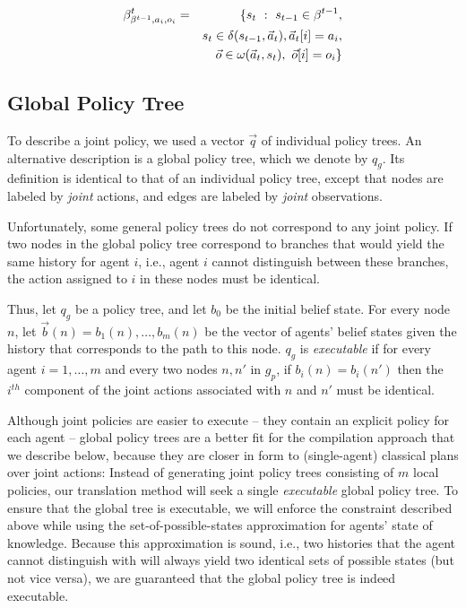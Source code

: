 \documentclass[letterpaper]{article}
\theoremstyle{definition}
\begin{document}
\begin{eqnarray}
\scriptsize
\beta^t_{\beta^{t-1},a_i,o_i} &=& \{ s_{t}~: ~s_{t-1}\in\beta^{t-1},\\ \nonumber
   && s_{t}\in\delta(s_{t-1},\vec{a}_t), \vec{a}_t[i] = a_i,\\ \nonumber
    &&\vec{o} \in \omega(\vec{a}_t,s_{t}), ~\vec{o}[i] = o_i\}
 \end{eqnarray}

\subsection{Global Policy Tree}
To describe a joint policy, we used a vector $\vec{q}$ of individual policy trees. An alternative description is a global policy tree,
which we denote by $q_g$. Its definition is identical to that of an individual policy tree, except that nodes are labeled by {\em joint} actions, and edges are labeled by {\em joint} observations.

Unfortunately, some general policy trees do not correspond to any joint policy. If two nodes in the global policy tree correspond to branches
that would yield the same history for agent $i$, i.e., agent $i$ cannot distinguish between these branches, the action assigned to $i$ in these
nodes must be identical.

Thus, let $q_g$ be a policy tree, and let $b_0$ be the initial belief state. For every node $n$, let $\vec{b}(n)= b_1(n),\ldots,b_m(n)$ be the
vector of agents' belief states given the history that corresponds to the path to this node. $q_g$ is {\em executable} if for every agent $i=1,\ldots, m$ and every two nodes $n,n'$ in $g_p$, if $b_i(n)=b_i(n')$ then the $i^{th}$ component of the joint actions associated with $n$ and $n'$ must be identical.

Although joint policies are easier to execute -- they contain an explicit policy for each agent -- global policy trees are a better fit for
the compilation approach that we describe below, because they are closer in form to (single-agent) classical plans over joint actions:
Instead of generating joint policy trees consisting of $m$ local policies, our translation method will seek a single {\em executable\/} global policy tree. To ensure that the global tree is executable, we will enforce the constraint described above
while using the set-of-possible-states approximation for agents' state of knowledge.
Because this approximation is sound, i.e., two histories that the agent cannot distinguish with will always
yield two identical sets of possible states (but not vice versa), we are guaranteed that the global policy tree is indeed executable.
\end{document}
